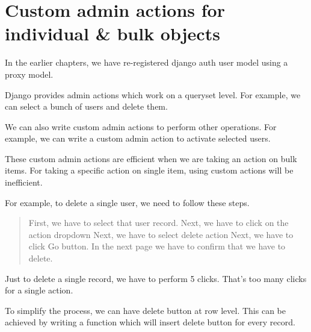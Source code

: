 \documentclass[a5paper,10pt,english]{sphinxmanual}
\begin{document}


\chapter{Custom admin actions for individual \& bulk objects}
\label{\detokenize{admin_custom_admin_actions:custom-admin-actions-for-individual-bulk-objects}}\label{\detokenize{admin_custom_admin_actions::doc}}
In the earlier chapters, we have re-registered django auth user model using a proxy model.

Django provides admin actions which work on a queryset level. For example, we can select a bunch of users and delete them.

We can also write custom admin actions to perform other operations. For example, we can write a custom admin action to activate selected users.

These custom admin actions are efficient when we are taking an action on bulk items. For taking a specific action on single item, using custom actions will be inefficient.

For example, to delete a single user, we need to follow these steps.
\begin{quote}

First, we have to select that user record.
Next, we have to click on the action dropdown
Next, we have to select delete action
Next, we have to click Go button.
In the next page we have to confirm that we have to delete.
\end{quote}

Just to delete a single record, we have to perform 5 clicks. That’s too many clicks for a single action.

To simplify the process, we can have delete button at row level. This can be achieved by writing a function which will insert delete button for every record.
\end{document}
